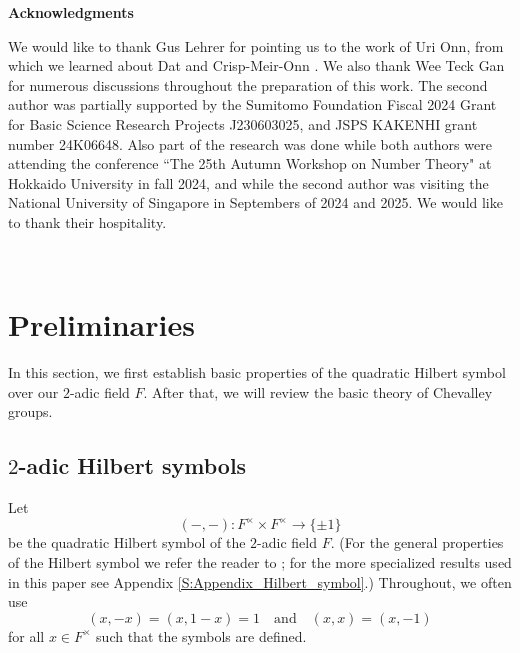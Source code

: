 \documentclass[10pt, letterpaper]{amsart}
\theoremstyle{plain}
\theoremstyle{definition}
\numberwithin{equation}{section}
\newcommand{\qand}{{\quad\text{and}\quad}}
\begin{document}

\quad


\begin{center}{\bf Acknowledgments}\end{center}
We would like to thank Gus Lehrer for pointing us to the work of Uri Onn, from which we learned about Dat \cite{D09} and Crisp-Meir-Onn \cite{CMO19}. We also thank Wee Teck Gan for numerous discussions throughout the preparation of this work. The second author was partially supported by the Sumitomo Foundation Fiscal 2024 Grant for Basic Science Research Projects J230603025, and  JSPS KAKENHI grant number 24K06648. Also part of the research was done while both authors were attending the conference ``The 25th Autumn Workshop on Number Theory" at Hokkaido University in fall 2024, and while the second author was visiting the National University of Singapore in Septembers of 2024 and 2025. We would like to thank their hospitality.



\quad\\




\section{Preliminaries}\label{S:Prelim}


In this section, we first establish basic properties of the quadratic Hilbert symbol over our $2$-adic field $F$. After that, we will review the basic theory of Chevalley groups.

\subsection{$2$-adic Hilbert symbols}\label{SS:HilbSymb}
Let
\[
(-,-):F^\times\times F^\times\longrightarrow \{\pm 1\}
\]
be the quadratic Hilbert symbol of the $2$-adic field $F$. (For the general properties of the Hilbert symbol we refer the reader to \cite[Chapter V \S 3]{Neukirch}; for the more specialized results used in this paper see Appendix \ref{S:Appendix_Hilbert_symbol}.) Throughout, we often use
\[
(x, -x)=(x, 1-x)=1\qand (x, x)=(x, -1)
\]
for all $x\in F^\times$ such that the symbols are defined.
\end{document}
